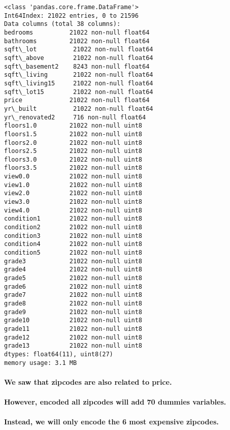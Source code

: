 \documentclass[11pt]{article}
\begin{document}
    \begin{Verbatim}[commandchars=\\\{\}]
<class 'pandas.core.frame.DataFrame'>
Int64Index: 21022 entries, 0 to 21596
Data columns (total 38 columns):
bedrooms          21022 non-null float64
bathrooms         21022 non-null float64
sqft\_lot          21022 non-null float64
sqft\_above        21022 non-null float64
sqft\_basement2    8243 non-null float64
sqft\_living       21022 non-null float64
sqft\_living15     21022 non-null float64
sqft\_lot15        21022 non-null float64
price             21022 non-null float64
yr\_built          21022 non-null float64
yr\_renovated2     716 non-null float64
floors1.0         21022 non-null uint8
floors1.5         21022 non-null uint8
floors2.0         21022 non-null uint8
floors2.5         21022 non-null uint8
floors3.0         21022 non-null uint8
floors3.5         21022 non-null uint8
view0.0           21022 non-null uint8
view1.0           21022 non-null uint8
view2.0           21022 non-null uint8
view3.0           21022 non-null uint8
view4.0           21022 non-null uint8
condition1        21022 non-null uint8
condition2        21022 non-null uint8
condition3        21022 non-null uint8
condition4        21022 non-null uint8
condition5        21022 non-null uint8
grade3            21022 non-null uint8
grade4            21022 non-null uint8
grade5            21022 non-null uint8
grade6            21022 non-null uint8
grade7            21022 non-null uint8
grade8            21022 non-null uint8
grade9            21022 non-null uint8
grade10           21022 non-null uint8
grade11           21022 non-null uint8
grade12           21022 non-null uint8
grade13           21022 non-null uint8
dtypes: float64(11), uint8(27)
memory usage: 3.1 MB

    \end{Verbatim}

    \paragraph{We saw that zipcodes are also related to
price.}\label{we-saw-that-zipcodes-are-also-related-to-price.}

\paragraph{However, encoded all zipcodes will add 70 dummies
variables.}\label{however-encoded-all-zipcodes-will-add-70-dummies-variables.}

\paragraph{Instead, we will only encode the 6 most expensive
zipcodes.}\label{instead-we-will-only-encode-the-6-most-expensive-zipcodes.}
\end{document}
